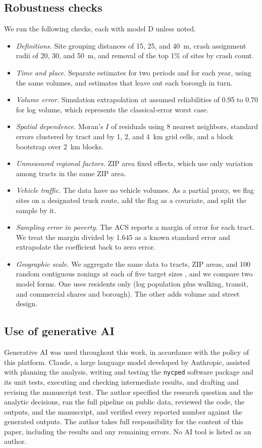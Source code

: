 \documentclass[10pt,twocolumn]{article}
\begin{document}
\subsection{Robustness checks}
We run the following checks, each with model D unless noted.
\begin{itemize}
\item \emph{Definitions.} Site grouping distances of 15, 25, and 40~m, crash assignment radii of 20, 30, and 50~m, and removal of the top 1\% of sites by crash count.
\item \emph{Time and place.} Separate estimates for two periods and for each year, using the same volumes, and estimates that leave out each borough in turn.
\item \emph{Volume error.} Simulation extrapolation \citep{cook1994simex} at assumed reliabilities of 0.95 to 0.70 for log volume, which represents the classical-error worst case.
\item \emph{Spatial dependence.} Moran's $I$ \citep{moran1950notes} of residuals using 8 nearest neighbors, standard errors clustered by tract and by 1, 2, and 4~km grid cells, and a block bootstrap over 2~km blocks.
\item \emph{Unmeasured regional factors.} ZIP area fixed effects, which use only variation among tracts in the same ZIP area.
\item \emph{Vehicle traffic.} The data have no vehicle volumes. As a partial proxy, we flag sites on a designated truck route, add the flag as a covariate, and split the sample by it.
\item \emph{Sampling error in poverty.} The ACS reports a margin of error for each tract. We treat the margin divided by 1.645 as a known standard error and extrapolate the coefficient back to zero error.
\item \emph{Geographic scale.} We aggregate the same data to tracts, ZIP areas, and 100 random contiguous zonings at each of five target sizes \citep{fotheringham1991mup}, and we compare two model forms. One uses residents only (log population plus walking, transit, and commercial shares and borough). The other adds volume and street design.
\end{itemize}

\subsection{Use of generative AI}
Generative AI was used throughout this work, in accordance with the policy of this platform. Claude, a large language model developed by Anthropic, assisted with planning the analysis, writing and testing the \texttt{nycped} software package and its unit tests, executing and checking intermediate results, and drafting and revising the manuscript text. The author specified the research question and the analytic decisions, ran the full pipeline on public data, reviewed the code, the outputs, and the manuscript, and verified every reported number against the generated outputs. The author takes full responsibility for the content of this paper, including the results and any remaining errors. No AI tool is listed as an author.
\end{document}
